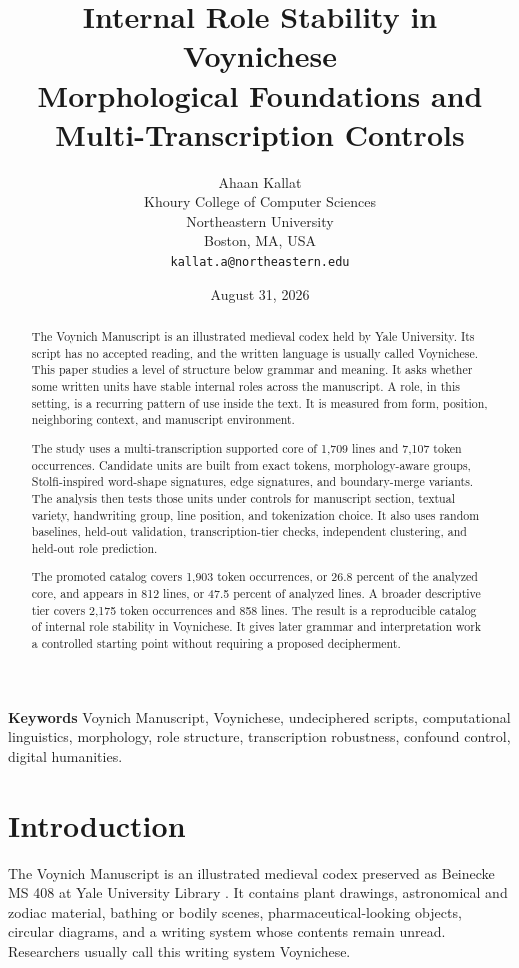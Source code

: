 \documentclass[11pt]{article}
\title{Internal Role Stability in Voynichese\\\large Morphological Foundations and Multi-Transcription Controls}
\author{Ahaan Kallat\\
Khoury College of Computer Sciences\\
Northeastern University\\
Boston, MA, USA\\
\texttt{kallat.a@northeastern.edu}}
\date{August 31, 2026}
\begin{document}
\maketitle

\begin{abstract}
The Voynich Manuscript is an illustrated medieval codex held by Yale University. Its script has no accepted reading, and the written language is usually called Voynichese. This paper studies a level of structure below grammar and meaning. It asks whether some written units have stable internal roles across the manuscript. A role, in this setting, is a recurring pattern of use inside the text. It is measured from form, position, neighboring context, and manuscript environment.

The study uses a multi-transcription supported core of 1,709 lines and 7,107 token occurrences. Candidate units are built from exact tokens, morphology-aware groups, Stolfi-inspired word-shape signatures, edge signatures, and boundary-merge variants. The analysis then tests those units under controls for manuscript section, textual variety, handwriting group, line position, and tokenization choice. It also uses random baselines, held-out validation, transcription-tier checks, independent clustering, and held-out role prediction.

The promoted catalog covers 1,903 token occurrences, or 26.8 percent of the analyzed core, and appears in 812 lines, or 47.5 percent of analyzed lines. A broader descriptive tier covers 2,175 token occurrences and 858 lines. The result is a reproducible catalog of internal role stability in Voynichese. It gives later grammar and interpretation work a controlled starting point without requiring a proposed decipherment.
\end{abstract}

\noindent\textbf{Keywords} Voynich Manuscript, Voynichese, undeciphered scripts, computational linguistics, morphology, role structure, transcription robustness, confound control, digital humanities.

\section{Introduction}

The Voynich Manuscript is an illustrated medieval codex preserved as Beinecke MS 408 at Yale University Library \cite{yale_ms408}. It contains plant drawings, astronomical and zodiac material, bathing or bodily scenes, pharmaceutical-looking objects, circular diagrams, and a writing system whose contents remain unread. Researchers usually call this writing system Voynichese.
\end{document}

